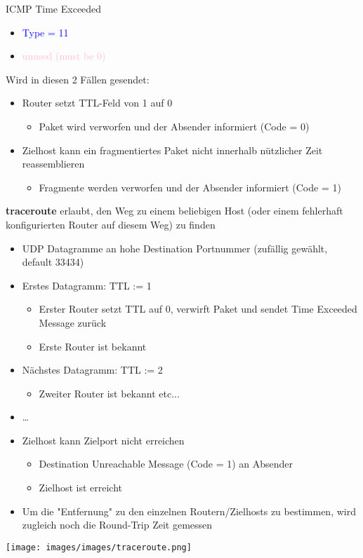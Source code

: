 \begin{definition}{ICMP Time Exceeded}
    \begin{itemize}
        \item \textcolor{blue}{Type = 11}
        \item \textcolor{pink}{unused (must be 0)}
    \end{itemize}
    Wird in diesen 2 Fällen gesendet:
    \begin{itemize}
        \item Router setzt TTL-Feld von 1 auf 0
        \begin{itemize}
            \item Paket wird verworfen und der Absender informiert (Code = 0)
        \end{itemize}
        \item Zielhost kann ein fragmentiertes Paket nicht innerhalb nützlicher Zeit reassemblieren
        \begin{itemize}
            \item Fragmente werden verworfen und der Absender informiert (Code = 1)
        \end{itemize}
    \end{itemize}
    \textbf{traceroute} erlaubt, den Weg zu einem beliebigen Host (oder einem fehlerhaft konfigurierten Router auf diesem Weg) zu finden
    \begin{itemize}
        \item UDP Datagramme an hohe Destination Portnummer (zufällig gewählt, default 33434)
        \item Erstes Datagramm: TTL := 1
        \begin{itemize}
            \item Erster Router setzt TTL auf 0, verwirft Paket und sendet Time Exceeded Message zurück
            \item Erste Router ist bekannt
        \end{itemize}
        \item Nächstes Datagramm: TTL := 2
        \begin{itemize}
            \item Zweiter Router ist bekannt etc...
        \end{itemize}
        \item …
        \item Zielhost kann Zielport nicht erreichen
        \begin{itemize}
            \item Destination Unreachable Message (Code = 1) an Absender
            \item Zielhost ist erreicht
        \end{itemize}
        \item Um die "Entfernung" zu den einzelnen Routern/Zielhosts zu bestimmen, wird zugleich noch die Round-Trip Zeit gemessen
    \end{itemize}
        \texttt{[image: images/images/traceroute.png]}
\end{definition}